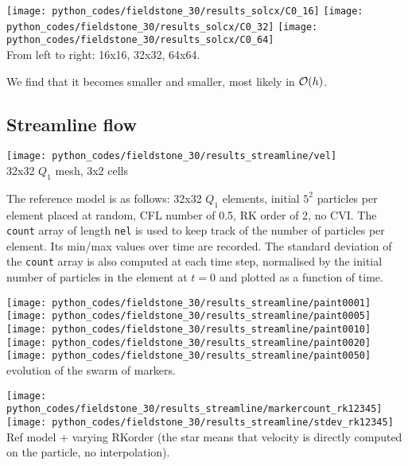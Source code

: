 \begin{center}
\texttt{[image: python\_codes/fieldstone\_30/results\_solcx/C0\_16]}
\texttt{[image: python\_codes/fieldstone\_30/results\_solcx/C0\_32]}
\texttt{[image: python\_codes/fieldstone\_30/results\_solcx/C0\_64]}\\
{\captionfont From left to right: 16x16, 32x32, 64x64.} 
\end{center}
We find that it becomes smaller and smaller, most likely in ${\cal O}(h)$.


\newpage
\subsection*{Streamline flow}


\begin{center}
\texttt{[image: python\_codes/fieldstone\_30/results\_streamline/vel]}\\
{\captionfont 32x32 $Q_1$ mesh, 3x2 cells}
\end{center}

The reference model is as follows: 32x32 $Q_1$ elements, initial $5^2$ particles per element placed at random, 
CFL number of 0.5, RK order of 2, no CVI.
The {\tt count} array of length {\tt nel} is used to keep track of the number of particles per element. 
Its min/max values over time are recorded. The standard deviation of the {\tt count} array is also 
computed at each time step, normalised by the 
initial number of particles in the element at $t=0$ and plotted as a function of time. 

\begin{center}
\texttt{[image: python\_codes/fieldstone\_30/results\_streamline/paint0001]}
\texttt{[image: python\_codes/fieldstone\_30/results\_streamline/paint0005]}
\texttt{[image: python\_codes/fieldstone\_30/results\_streamline/paint0010]}
\texttt{[image: python\_codes/fieldstone\_30/results\_streamline/paint0020]}
\texttt{[image: python\_codes/fieldstone\_30/results\_streamline/paint0050]}\\
{\captionfont evolution of the swarm of markers.}
\end{center} 


\begin{center}
\texttt{[image: python\_codes/fieldstone\_30/results\_streamline/markercount\_rk12345]}
\texttt{[image: python\_codes/fieldstone\_30/results\_streamline/stdev\_rk12345]}\\
{\captionfont Ref model + varying RKorder (the star means that velocity 
is directly computed on the particle, no interpolation).}
\end{center} 

